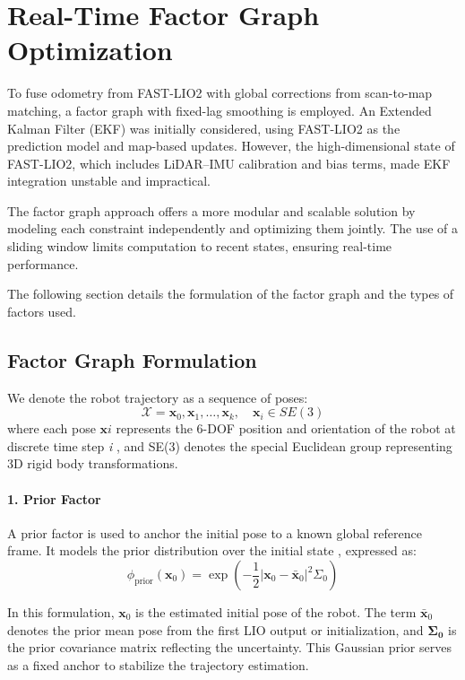 \section{ Real-Time Factor Graph Optimization }
\label{sec:fusion}

To fuse odometry from FAST-LIO2 with global corrections from scan-to-map matching, a factor graph with fixed-lag smoothing is employed. An Extended Kalman Filter (EKF) was initially considered, using FAST-LIO2 as the prediction model and map-based updates. However, the high-dimensional state of FAST-LIO2, which includes LiDAR–IMU calibration and bias terms, made EKF integration unstable and impractical.

The factor graph approach offers a more modular and scalable solution by modeling each constraint independently and optimizing them jointly. The use of a sliding window limits computation to recent states, ensuring real-time performance.

The following section details the formulation of the factor graph and the types of factors used.

\subsection{Factor Graph Formulation}

We denote the robot trajectory as a sequence of poses:
\begin{equation}
	\mathcal{X} = { \mathbf{x}_0, \mathbf{x}_1, \dots, \mathbf{x}_k }, \quad \mathbf{x}_i \in SE(3)
\end{equation}
where each pose $\mathbf{x}i $  represents the 6-DOF position and orientation of the robot at discrete time step \textit{i} , and SE(3) denotes the special Euclidean group representing 3D rigid body transformations.

\paragraph{1. Prior Factor}
A prior factor is used to anchor the initial pose to a known global reference frame. It models the prior distribution over the initial state , expressed as:
\begin{equation}
	\phi_{\text{prior}}(\mathbf{x}_0) = \exp\left( -\frac{1}{2} | \mathbf{x}_0 - \bar{\mathbf{x}}_0 |^2{\Sigma_0} \right)
\end{equation}

In this formulation, $\mathbf{x}_0$ is the estimated initial pose of the robot. The term $\bar{\mathbf{x}}_0$ denotes the prior mean pose from the first LIO output or initialization, and $\mathbf{{\Sigma_0}}$ is the prior covariance matrix reflecting the uncertainty. This Gaussian prior serves as a fixed anchor to stabilize the trajectory estimation.

